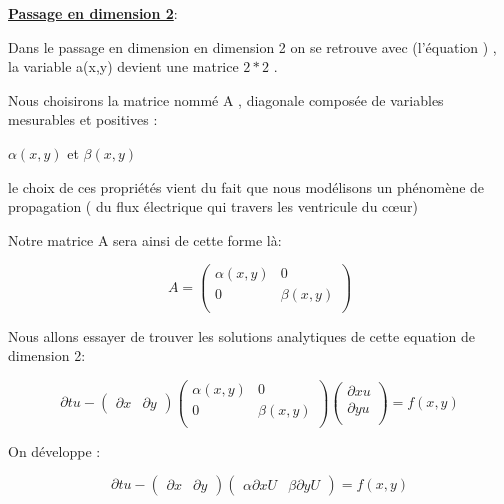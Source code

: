 \documentclass[a4paper,12pt,twoside]{report}
\begin{document}
\underline{\textbf{Passage en dimension 2}}: 



Dans le passage en dimension en dimension 2 on se retrouve avec (l'équation ) , la variable a(x,y) devient une matrice $2*2$ .

Nous choisirons la matrice nommé A , diagonale composée de variables mesurables et positives :

 $\alpha(x,y)$ et $\beta(x,y)$

 

 le choix de ces  propriétés vient du fait que nous modélisons un phénomène de propagation ( du flux électrique qui travers les ventricule du cœur)


Notre matrice A sera ainsi de cette forme là:


\begin{equation}
A=\begin{pmatrix}\alpha(x,y)&0\\

0&\beta(x,y)\\\end{pmatrix}
 \end{equation}


Nous allons essayer de trouver les solutions analytiques de cette equation de dimension 2: 

\begin{equation}
\partial{t} u -\begin{pmatrix}\partial{x} & \partial{y}

\end{pmatrix} \begin{pmatrix}\alpha(x,y)&0\\

0&\beta(x,y)\\\end{pmatrix} \begin{pmatrix}\partial{x}u\\

\partial{y}u\\

\end{pmatrix} =f(x,y)
\end{equation}


On développe :

 

\begin{equation}
\partial{t} u -\begin{pmatrix}\partial{x} & \partial{y}

\end{pmatrix}\begin{pmatrix}\alpha \partial{x}U & \beta\partial{y} U

\end{pmatrix}=f(x,y)
\end{equation}
\end{document}
